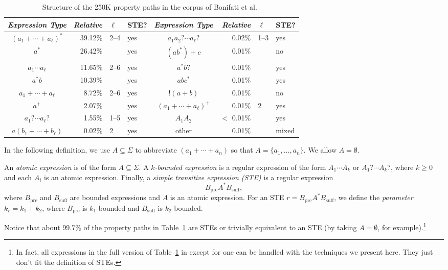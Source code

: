 \documentclass[a4paper,english]{lipics-v2016}
\theoremstyle{plain}
\begin{document}
\begin{table}[tb]
  \centering
  \begin{tabular}{@{}crll|crll@{}}
    \toprule
    \emph{Expression Type} & \emph{Relative} & $\ell$& STE? &
    \emph{Expression Type} & \emph{Relative} & $\ell$ & STE?\\
    \midrule
    $(a_1 + \cdots +a_\ell)^*$ & 39.12\% & 2--4& yes &
    $a_1 a_2? \cdots a_\ell?$ & 0.02\% & 1--3 & yes \\
    $a^*$ & 26.42\%& & yes &$(a b^*)+c$ & 0.01\%&& no\\
    $a_1 \cdots a_\ell$ & 11.65\% &  2--6 & yes& $a^* b?$ & 0.01\% && yes\\
    $a^* b$ & 10.39\% & & yes& $a b c^*$ &   0.01\%&& yes\\
    $a_1+ \cdots +a_\ell$ & 8.72\% & 2--6 & yes& $!(a+b)$ & 0.01\%&& no\\
    $a^+$ & 2.07\%&& yes &$(a_1 +\cdots +a_\ell)^+$ & 0.01\% & 2& yes\\
    $a_1? \cdots a_\ell?$ & 1.55\% & 1--5&  yes & $A_1 A_2$ &  $<$ 0.01\% & & yes\\
    $a(b_1+\cdots+b_\ell)$ & 0.02\% & 2 & yes& other  & 0.01\%& & mixed\\    
  \end{tabular}
  \caption{Structure of the 250K property paths in the corpus of
    Bonifati et al.~\cite{BonifatiMT-corr17}\label{fig:propertypaths}
}
\end{table}


In the following definition, we use $A \subseteq \Sigma$ to abbreviate
$(a_1 + \cdots + a_n)$ so that $A = \{a_1,\ldots,a_n\}$. We allow $A = \emptyset$.
\begin{definition}\label{def:ste}
  An \emph{atomic expression} is of the form $A \subseteq \Sigma$.  A
  \emph{$k$-bounded expression} is a regular expression of the form
  $A_1 \cdots A_k$ or $A_1? \cdots A_k?$, where $k \geq 0$ and each
  $A_i$ is an atomic expression. 
  Finally, a \emph{simple transitive expression (STE)} is a
  regular expression $$B_\text{pre} A^* B_\text{suff},$$ where
  $B_\text{pre}$ and $B_\text{suff}$ are bounded expressions and $A$
  is an atomic expression. For an STE $r = B_\text{pre} A^*
  B_\text{suff}$, we define the \emph{parameter $k_r = k_1 + k_2$},
  where $B_\text{pre}$ is $k_1$-bounded and $B_\text{suff}$ is
  $k_2$-bounded.
\end{definition}
Notice that about 99.7\% of the property paths in
Table~\ref{fig:propertypaths} are STEs or trivially equivalent to an
STE (by taking $A = \emptyset$, for example).\footnote{In fact, all
  expressions in the full version of Table~\ref{fig:propertypaths} in \cite{BonifatiMT-corr17} except for one
  can be handled with the techniques we present here. They just don't
  fit the definition of STEs.}
\end{document}
